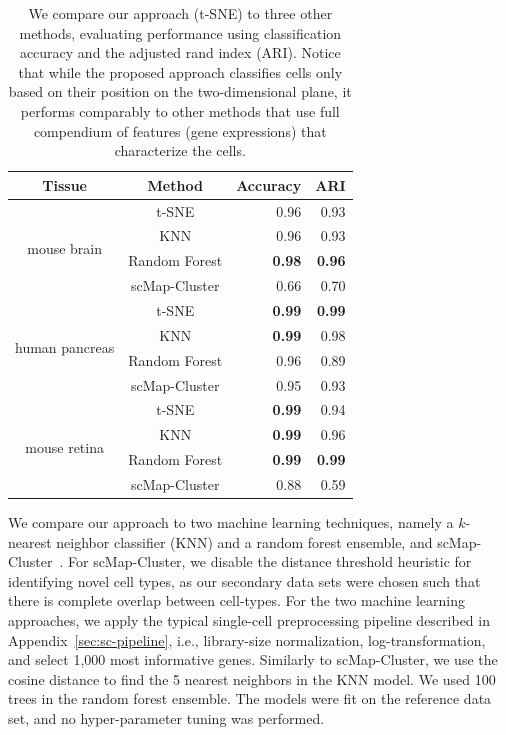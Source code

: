 \documentclass[runningheads]{llncs}
\begin{document}
\begin{table}[ht]
\centering
  \setlength\tabcolsep{6pt}
  \begin{tabular}{c c r r}
  \toprule
  Tissue & Method & Accuracy & ARI \\
  \toprule
  \multirow{4}{*}{mouse brain} & t-SNE & 0.96 & 0.93 \\
   & KNN & 0.96 & 0.93 \\
   & Random Forest & \textbf{0.98} & \textbf{0.96} \\
   & scMap-Cluster & 0.66 & 0.70 \\
  \midrule
  \multirow{4}{*}{human pancreas} & t-SNE & \textbf{0.99} & \textbf{0.99} \\
   & KNN & \textbf{0.99} & 0.98 \\
   & Random Forest & 0.96 & 0.89 \\
   & scMap-Cluster & 0.95 & 0.93 \\
  \midrule
  \multirow{4}{*}{mouse retina} & t-SNE & \textbf{0.99} & 0.94 \\
   & KNN & \textbf{0.99} & 0.96 \\
   & Random Forest & \textbf{0.99} & \textbf{0.99} \\
   & scMap-Cluster & 0.88 & 0.59 \\
  \bottomrule
  \end{tabular}
  \caption{We compare our approach (t-SNE) to three other methods, evaluating
    performance using classification accuracy and the adjusted rand index (ARI).
    Notice that while the proposed approach classifies cells only based on their
    position on the two-dimensional plane, it performs comparably to other
    methods that use full compendium of features (gene expressions) that
    characterize the cells.}
  \label{tab:scores}
\end{table}

We compare our approach to two machine learning techniques, namely a $k$-nearest
neighbor classifier (KNN) and a random forest ensemble, and
scMap-Cluster~\cite{Kiselev2018}. For scMap-Cluster, we disable the distance
threshold heuristic for identifying novel cell types, as our secondary data sets
were chosen such that there is complete overlap between cell-types. For the two
machine learning approaches, we apply the typical single-cell preprocessing
pipeline described in Appendix~\ref{sec:sc-pipeline}, i.e., library-size
normalization, log-transformation, and select 1,000 most informative genes.
Similarly to scMap-Cluster, we use the cosine distance to find the 5 nearest
neighbors in the KNN model. We used 100 trees in the random forest ensemble. The
models were fit on the reference data set, and no hyper-parameter tuning was
performed.
\end{document}
